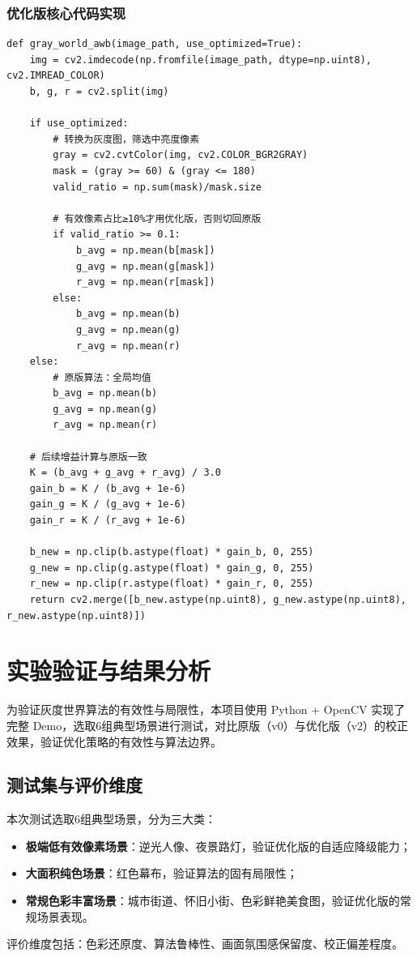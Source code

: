 \documentclass[12pt,a4paper,UTF8]{ctexart} %
\begin{document}
\subsubsection{优化版核心代码实现}
\begin{lstlisting}[caption={优化版灰度世界算法核心实现}, label=code:awb_opt]
def gray_world_awb(image_path, use_optimized=True):
    img = cv2.imdecode(np.fromfile(image_path, dtype=np.uint8), cv2.IMREAD_COLOR)
    b, g, r = cv2.split(img)
    
    if use_optimized:
        # 转换为灰度图，筛选中亮度像素
        gray = cv2.cvtColor(img, cv2.COLOR_BGR2GRAY)
        mask = (gray >= 60) & (gray <= 180)
        valid_ratio = np.sum(mask)/mask.size
        
        # 有效像素占比≥10%才用优化版，否则切回原版
        if valid_ratio >= 0.1:
            b_avg = np.mean(b[mask])
            g_avg = np.mean(g[mask])
            r_avg = np.mean(r[mask])
        else:
            b_avg = np.mean(b)
            g_avg = np.mean(g)
            r_avg = np.mean(r)
    else:
        # 原版算法：全局均值
        b_avg = np.mean(b)
        g_avg = np.mean(g)
        r_avg = np.mean(r)
    
    # 后续增益计算与原版一致
    K = (b_avg + g_avg + r_avg) / 3.0
    gain_b = K / (b_avg + 1e-6)
    gain_g = K / (g_avg + 1e-6)
    gain_r = K / (r_avg + 1e-6)
    
    b_new = np.clip(b.astype(float) * gain_b, 0, 255)
    g_new = np.clip(g.astype(float) * gain_g, 0, 255)
    r_new = np.clip(r.astype(float) * gain_r, 0, 255)
    return cv2.merge([b_new.astype(np.uint8), g_new.astype(np.uint8), r_new.astype(np.uint8)])
\end{lstlisting}

\section{实验验证与结果分析}

为验证灰度世界算法的有效性与局限性，本项目使用 Python + OpenCV 实现了完整 Demo，选取6组典型场景进行测试，对比原版（v0）与优化版（v2）的校正效果，验证优化策略的有效性与算法边界。

\subsection{测试集与评价维度}
本次测试选取6组典型场景，分为三大类：
\begin{itemize}
    \item \textbf{极端低有效像素场景}：逆光人像、夜景路灯，验证优化版的自适应降级能力；
    \item \textbf{大面积纯色场景}：红色幕布，验证算法的固有局限性；
    \item \textbf{常规色彩丰富场景}：城市街道、怀旧小街、色彩鲜艳美食图，验证优化版的常规场景表现。
\end{itemize}
评价维度包括：色彩还原度、算法鲁棒性、画面氛围感保留度、校正偏差程度。
\end{document}

